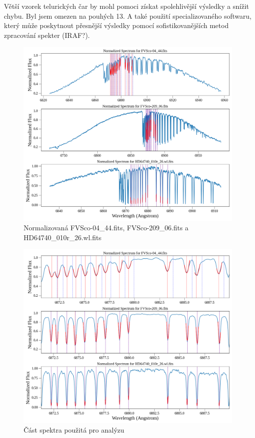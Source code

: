 \documentclass[a4paper,11pt,twocolumn]{article}
\begin{document}
        Větší vzorek telurických čar by mohl pomoci získat spolehlivější výsledky a snížit chybu. Byl jsem omezen na pouhých 13. A také použití specializovaného softwaru, který může poskytnout přesnější výsledky pomocí sofistikovanějších metod zpracování spekter (IRAF?). 

    
    \nocite{*}
    

    \begin{figure}
        \centering
        \includegraphics[width=1\textwidth]{spectra.png}
        \caption{Normalizovaná FVSco-04\_44.fits, FVSco-209\_06.fits a HD64740\_010r\_26.wl.fits}
        \label{fig:spectra}
    \end{figure}

    \begin{figure}
        \centering
        \includegraphics[width=1\textwidth]{spectra_telur.png}
        \caption{Část spektra použitá pro analýzu}
        \label{fig:spectra_telur}
    \end{figure}
\end{document}
